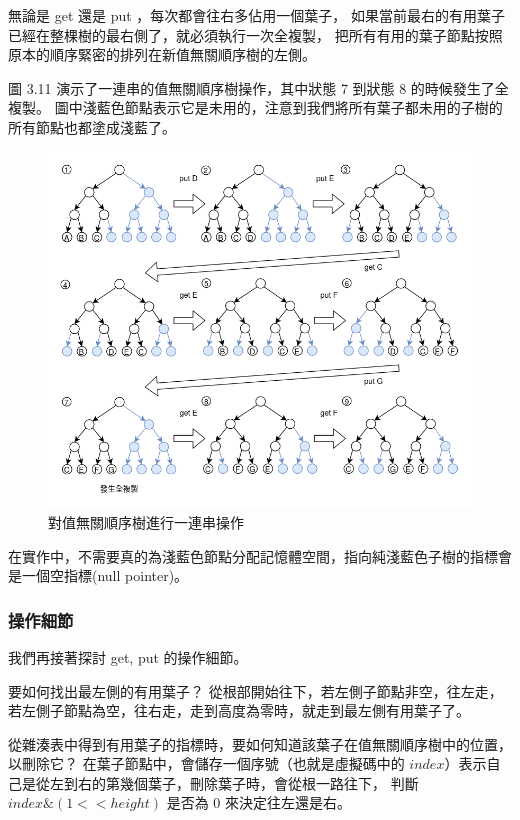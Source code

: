 無論是 get 還是 put ，每次都會往右多佔用一個葉子，
如果當前最右的有用葉子已經在整棵樹的最右側了，就必須執行一次全複製，
把所有有用的葉子節點按照原本的順序緊密的排列在新值無關順序樹的左側。

圖 3.11 演示了一連串的值無關順序樹操作，其中狀態 7 到狀態 8 的時候發生了全複製。
圖中淺藍色節點表示它是未用的，注意到我們將所有葉子都未用的子樹的所有節點也都塗成淺藍了。

\begin{figure}[h!]
\includegraphics[width=\textwidth]{順序樹連續變化}
\caption{對值無關順序樹進行一連串操作}
\end{figure}

在實作中，不需要真的為淺藍色節點分配記憶體空間，指向純淺藍色子樹的指標會是一個空指標(null pointer)。

\subsubsection{操作細節}

我們再接著探討 get, put 的操作細節。

要如何找出最左側的有用葉子？
從根部開始往下，若左側子節點非空，往左走，若左側子節點為空，往右走，走到高度為零時，就走到最左側有用葉子了。

從雜湊表中得到有用葉子的指標時，要如何知道該葉子在值無關順序樹中的位置，以刪除它？
在葉子節點中，會儲存一個序號（也就是虛擬碼中的 $index$）表示自己是從左到右的第幾個葉子，刪除葉子時，會從根一路往下，
判斷 $index \& (1 << height)$ 是否為 0 來決定往左還是右。


